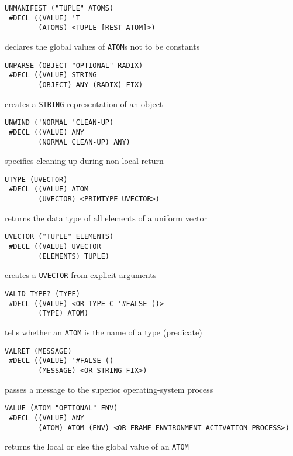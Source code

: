 \documentclass[a4paper]{scrbook}
\begin{document}
\begin{verbatim}
UNMANIFEST ("TUPLE" ATOMS)
 #DECL ((VALUE) 'T
        (ATOMS) <TUPLE [REST ATOM]>)
\end{verbatim}

declares the global values of \texttt{ATOM}s not to be constants

\begin{verbatim}
UNPARSE (OBJECT "OPTIONAL" RADIX)
 #DECL ((VALUE) STRING
        (OBJECT) ANY (RADIX) FIX)
\end{verbatim}

creates a \texttt{STRING} representation of an object

\begin{verbatim}
UNWIND ('NORMAL 'CLEAN-UP)
 #DECL ((VALUE) ANY
        (NORMAL CLEAN-UP) ANY)
\end{verbatim}

specifies cleaning-up during non-local return

\begin{verbatim}
UTYPE (UVECTOR)
 #DECL ((VALUE) ATOM
        (UVECTOR) <PRIMTYPE UVECTOR>)
\end{verbatim}

returns the data type of all elements of a uniform vector

\begin{verbatim}
UVECTOR ("TUPLE" ELEMENTS)
 #DECL ((VALUE) UVECTOR
        (ELEMENTS) TUPLE)
\end{verbatim}

creates a \texttt{UVECTOR} from explicit arguments

\begin{verbatim}
VALID-TYPE? (TYPE)
 #DECL ((VALUE) <OR TYPE-C '#FALSE ()>
        (TYPE) ATOM)
\end{verbatim}

tells whether an \texttt{ATOM} is the name of a type (predicate)

\begin{verbatim}
VALRET (MESSAGE)
 #DECL ((VALUE) '#FALSE ()
        (MESSAGE) <OR STRING FIX>)
\end{verbatim}

passes a message to the superior operating-system process

\begin{verbatim}
VALUE (ATOM "OPTIONAL" ENV)
 #DECL ((VALUE) ANY
        (ATOM) ATOM (ENV) <OR FRAME ENVIRONMENT ACTIVATION PROCESS>)
\end{verbatim}

returns the local or else the global value of an \texttt{ATOM}
\end{document}
